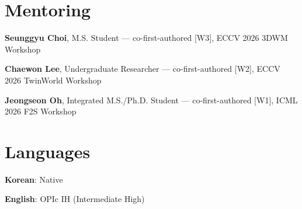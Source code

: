 \documentclass[10pt]{article}
\begin{document}
\section{Mentoring}
\begin{details}[leftmargin=2.6em]
  \item \textbf{Seunggyu Choi}, M.S. Student --- co-first-authored [W3], ECCV 2026 3DWM Workshop
  \item \textbf{Chaewon Lee}, Undergraduate Researcher --- co-first-authored [W2], ECCV 2026 TwinWorld Workshop
  \item \textbf{Jeongseon Oh}, Integrated M.S./Ph.D. Student --- co-first-authored [W1], ICML 2026 F2S Workshop
\end{details}

\section{Languages}
\begin{details}[leftmargin=2.6em]
  \item \textbf{Korean}: Native
  \item \textbf{English}: OPIc IH (Intermediate High)
\end{details}




\end{document}
